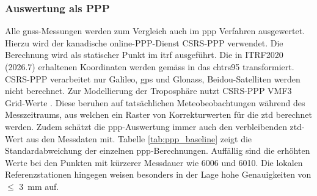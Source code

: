 \subsubsection{Auswertung als PPP}
\label{sec:ppp}
Alle \acrshort{gnss}-Messungen werden zum Vergleich auch im \gls{ppp} Verfahren ausgewertet. Hierzu 
wird der kanadische online-PPP-Dienst CSRS-PPP \parencite{governmentofcanadaPrecisePointPositioning2026} verwendet. 
Die Berechnung wird als statischer Punkt im \gls{itrf} ausgeführt. 
Die in ITRF2020 (2026.7) erhaltenen Koordinaten werden gemäss \textcite{lennstromUebungPPP40202026} in das \gls{chtrs95} transformiert.
CSRS-PPP verarbeitet nur Galileo, \gls{gps} und Glonass, Beidou-Satelliten werden nicht berechnet. Zur Modellierung 
der Troposphäre nutzt CSRS-PPP VMF3 Grid-Werte \parencite{governmentofcanadaPrecisePointPositioning2026}. Diese beruhen auf tatsächlichen Meteobeobachtungen 
während des Messzeitraums, aus welchen ein Raster von Korrekturwerten für die \gls{ztd} berechnet werden. Zudem schätzt die \acrshort{ppp}-Auswertung 
immer auch den verbleibenden \acrshort{ztd}-Wert aus den Messdaten mit. Tabelle \ref{tab:ppp_baseline} zeigt die Standardabweichung der einzelnen 
\acrshort{ppp}-Berechnungen. Auffällig sind die erhöhten Werte bei den Punkten mit kürzerer Messdauer wie 6006 und 6010. Die lokalen 
Referenzstationen hingegen weisen besonders in der Lage hohe Genauigkeiten von $ \leq $ 3~mm  auf.

